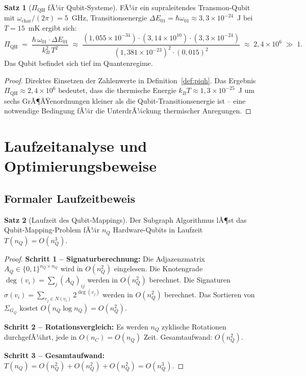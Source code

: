 ﻿\documentclass[a4paper,12pt]{article}
\theoremstyle{definition}
\newtheorem{satz}{Satz}
\begin{document}
\begin{satz}[$\Pi_\mathrm{QH}$ fÃ¼r Qubit-Systeme]
\label{satz:piqh}
FÃ¼r ein supraleitendes Transmon-Qubit mit $\omega_\mathrm{char}/(2\pi) = 5$~GHz,
Transitionsenergie $\Delta E_{01} = \hbar\omega_{01} \approx 3{,}3\times10^{-24}$~J
bei $T = 15$~mK ergibt sich:
\[
  \Pi_\mathrm{QH} \;=\;
  \frac{\hbar\,\omega_{01}\cdot\Delta E_{01}}{k_B^2\,T^2}
  \;\approx\;
  \frac{(1{,}055\times10^{-34})\cdot(3{,}14\times10^{10})
  \cdot(3{,}3\times10^{-24})}{(1{,}381\times10^{-23})^2\cdot(0{,}015)^2}
  \;\approx\; 2{,}4\times10^{6} \;\gg\; 1.
\]
Das Qubit befindet sich tief im Quantenregime.
\end{satz}

\begin{proof}
Direktes Einsetzen der Zahlenwerte in Definition~\ref{def:piqh}. Das Ergebnis
$\Pi_\mathrm{QH} \approx 2{,}4 \times 10^6$ bedeutet, dass die thermische
Energie $k_B T \approx 1{,}3\times10^{-25}$~J um sechs GrÃ¶ÃŸenordnungen kleiner
als die Qubit-Transitionsenergie ist -- eine notwendige Bedingung fÃ¼r die
UnterdrÃ¼ckung thermischer Anregungen.
\end{proof}

\section{Laufzeitanalyse und Optimierungsbeweise}
\label{sec:analyse}

\subsection{Formaler Laufzeitbeweis}

\begin{satz}[Laufzeit des Qubit-Mappings]
\label{satz:laufzeit}
Der Subgraph Algorithmus lÃ¶st das Qubit-Mapping-Problem fÃ¼r $n_Q$ Hardware-Qubits
in Laufzeit $T(n_Q) = O(n_Q^3)$.
\end{satz}

\begin{proof}
\textbf{Schritt 1 -- Signaturberechnung:} Die Adjazenzmatrix $A_Q \in
\{0,1\}^{n_Q\times n_Q}$ wird in $O(n_Q^2)$ eingelesen. Die Knotengrade
$\deg(v_i) = \sum_j (A_Q)_{ij}$ werden in $O(n_Q^2)$ berechnet. Die Signaturen
$\sigma(v_i) = \sum_{v_j \in N(v_i)} 2^{\deg(v_j)}$ werden in $O(n_Q^2)$
berechnet. Das Sortieren von $\Sigma_{G_Q}$ kostet $O(n_Q \log n_Q) = O(n_Q^2)$.

\textbf{Schritt 2 -- Rotationsvergleich:} Es werden $n_Q$ zyklische Rotationen
durchgefÃ¼hrt, jede in $O(n_C) = O(n_Q)$ Zeit. Gesamtaufwand: $O(n_Q^2)$.

\textbf{Schritt 3 -- Gesamtaufwand:}
$T(n_Q) = O(n_Q^2) + O(n_Q^2) + O(n_Q^2) = O(n_Q^3)$.
\end{proof}
\end{document}
